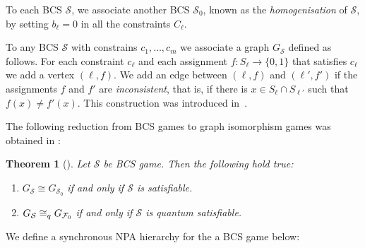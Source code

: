 \documentclass[11pt,a4paper]{article}
\theoremstyle{plain}
\newtheorem{thm}{Theorem}[section]
\theoremstyle{remark}
\theoremstyle{definition}
\def\calS{{\mathcal S}} \def\calT{{\mathcal T}} \def\calU{{\mathcal U}}
\begin{document}
To each BCS $\calS$, we associate another BCS $\calS_0$, known as the \emph{homogenisation} of $\calS$, by setting $b_{\ell} = 0$ in all the constraints $C_{\ell}$. 

To any BCS $\calS$ with constrains $c_1,\dots, c_m$ we associate a graph $G_\calS$ defined as follows.
For each constraint $c_\ell$ and each assignment $f\colon S_\ell \to \{0,1\}$ that satisfies $c_\ell$ we add a vertex $(\ell, f)$.
We add an edge between $(\ell, f)$ and $(\ell', f')$ if the assignments $f$ and $f'$ are \emph{inconsistent}, that is, if there is $x \in S_\ell \cap S_{\ell'}$ such that $f(x) \neq f'(x)$.
This construction was introduced in~\cite{ATSERIAS2019289}.

The following reduction from BCS games to graph isomorphism games was obtained in \cite{ATSERIAS2019289}: 

\begin{thm}[{\cite[Theorem 6.2, Theorem 7.1]{ATSERIAS2019289}}]
    Let $\calS$ be BCS game. Then the following hold true: 
    \begin{enumerate}[label = (\roman*)]
        \item $G_{\calS} \cong G_{\calS_0}$ if and only if $\calS$ is satisfiable. 
        \item $G_{\calS} \cong_{q} G_{\calF_0}$ if and only if $\calS$ is quantum satisfiable. 
    \end{enumerate}
\end{thm}

We define a synchronous NPA hierarchy for the a BCS game below:
\end{document}

